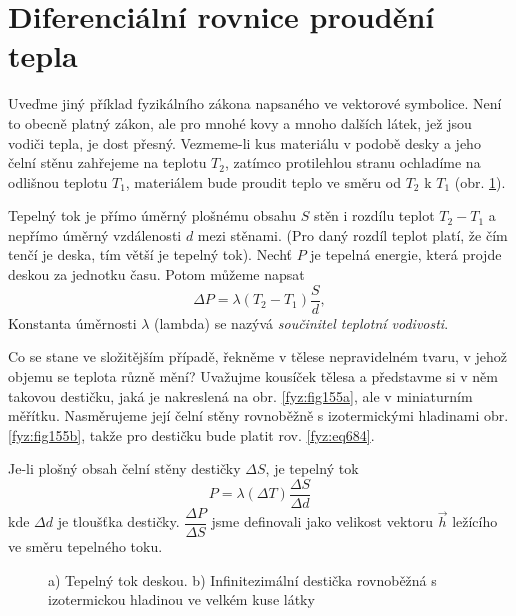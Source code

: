   \section{Diferenciální rovnice proudění tepla}\label{fyz:IIchapIIsecVI}
    Uveďme jiný příklad fyzikálního zákona napsaného ve vektorové symbolice. Není to obecně platný 
    zákon, ale pro mnohé kovy a mnoho dalších látek, jež jsou vodiči tepla, je dost přesný. 
    Vezmeme-li kus materiálu v podobě desky a jeho čelní stěnu zahřejeme na teplotu $T_2$, zatímco 
    protilehlou stranu ochladíme na odlišnou teplotu $T_1$, materiálem bude proudit teplo ve směru 
    od $T_2$ k $T_1$ (obr. \ref{fyz:fig155}).
    
    Tepelný tok je přímo úměrný plošnému obsahu $S$ stěn i rozdílu teplot $T_2-T_1$ a nepřímo 
    úměrný vzdálenosti $d$ mezi stěnami. (Pro daný rozdíl teplot platí, že čím tenčí je deska, tím 
    větší je tepelný tok). Nechť $P$ je tepelná energie, která projde deskou za jednotku času. 
    Potom můžeme napsat
    \begin{equation}\label{fyz:eq684}
      \Delta P=\lambda(T_2-T_1)\frac{S}{d},
    \end{equation}
    Konstanta úměrnosti $\lambda$ (lambda) se nazývá \emph{součinitel teplotní vodivosti}.
    
    Co se stane ve složitějším případě, řekněme v tělese nepravidelném tvaru, v jehož objemu se 
    teplota různě mění? Uvažujme kousíček tělesa a představme si v něm takovou destičku, jaká je 
    nakreslená na obr. \ref{fyz:fig155a}, ale v miniaturním měřítku. Nasměrujeme její čelní 
    stěny rovnoběžně s izotermickými hladinami obr. \ref{fyz:fig155b}, takže pro destičku bude 
    platit rov. \ref{fyz:eq684}.
    
    Je-li plošný obsah čelní stěny destičky $\Delta S$, je tepelný tok
    \begin{equation}\label{fyz:eq683}
      P=\lambda(\Delta T)\frac{\Delta S}{\Delta d}
    \end{equation}
    kde $\Delta d$ je tloušťka destičky. $\dfrac{\Delta P}{\Delta S}$ jsme definovali jako velikost
    vektoru $\vec{h}$ ležícího ve směru tepelného toku. 

    \begin{figure}[ht!]
      \centering
      \caption{a) Tepelný tok deskou. b) Infinitezimální destička rovnoběžná s izotermickou 
               hladinou ve velkém kuse látky \cite[s.~38]{Feynman02}}
      \label{fyz:fig155}
    \end{figure}

